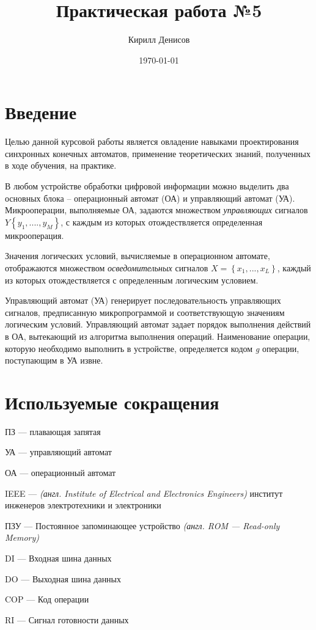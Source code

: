 \documentclass[a4paper,14pt]{extarticle}
\author{Кирилл Денисов}
\title{Практическая работа №5}
\date{\today}
\begin{document}
	
	\def\contentsname{СОДЕРЖАНИЕ}
	\setcounter{page}{2} %
	\tableofcontents


\section {Введение}
Целью данной курсовой работы является овладение навыками проектирования синхронных конечных автоматов, применение теоретических знаний, полученных в ходе обучения,  на практике.

В любом устройстве обработки цифровой информации можно выделить два основных блока – операционный автомат (ОА) и управляющий автомат (УА). Микрооперации, выполняемые ОА, задаются множеством \textit{управляющих} сигналов $Y\left\{y_1,....,y_M\right\}$, с каждым из которых отождествляется определенная микрооперация.

Значения логических условий, вычисляемые в операционном автомате, отображаются множеством \textit{осведомительных} сигналов $X=\left\{x_1,...,x_L\right\}$, каждый из которых отождествляется с определенным логическим условием.

Управляющий автомат (УА) генерирует последовательность управляющих сигналов, предписанную микропрограммой и соответствующую значениям логическим условий. Управляющий автомат задает порядок выполнения действий в ОА, вытекающий из алгоритма выполнения операций. Наименование операции, которую необходимо выполнить в устройстве, определяется кодом \textit{g} операции, поступающим в УА извне. 
\section {Используемые сокращения}
ПЗ --- плавающая запятая

УА --- управляющий автомат

ОА --- операционный автомат

IEEE --- \textit{(англ. Institute of Electrical and Electronics Engineers)} институт инженеров электротехники и электроники

ПЗУ --- Постоянное запоминающее устройство \textit{(англ. ROM --- Read-only Memory)}

DI			---	Входная шина данных

 DO		---	Выходная шина данных
 
 COP		---	Код операции
 
 RI			---	Сигнал готовности данных
 
\end{document}
